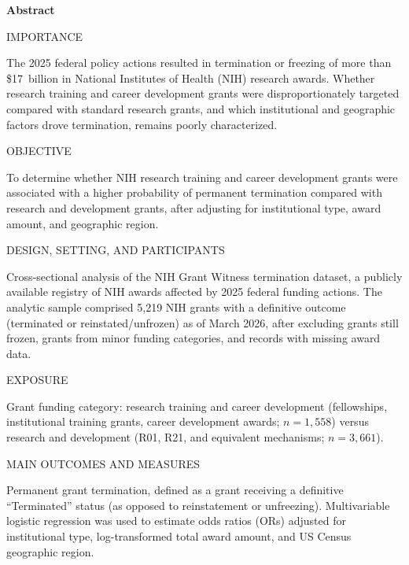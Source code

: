 \documentclass[10pt, letterpaper]{article}
\newcommand{\abslabel}[1]{%
  {\vspace{4pt}\noindent\sffamily\fontseries{b}\selectfont\fontsize{8.5}{10}\selectfont #1\enspace}%
}
\newcommand{\absrule}{%
  \vspace{3pt}\noindent{\color{jamacrimson}\rule{0.62\textwidth}{0.4pt}}\vspace{3pt}%
}
\begin{document}
\noindent
\begin{minipage}[t]{0.62\textwidth}
{\sffamily\bfseries\fontsize{11}{13}\selectfont\color{jamacrimson} Abstract\par}
\vspace{4pt}

\abslabel{IMPORTANCE}
{\fontsize{9}{11.5}\selectfont
The 2025 federal policy actions resulted in termination or freezing of more than \$17~billion in National Institutes of Health (NIH) research awards. Whether research training and career development grants were disproportionately targeted compared with standard research grants, and which institutional and geographic factors drove termination, remains poorly characterized.\par}

\absrule

\abslabel{OBJECTIVE}
{\fontsize{9}{11.5}\selectfont
To determine whether NIH research training and career development grants were associated with a higher probability of permanent termination compared with research and development grants, after adjusting for institutional type, award amount, and geographic region.\par}

\absrule

\abslabel{DESIGN, SETTING, AND PARTICIPANTS}
{\fontsize{9}{11.5}\selectfont
Cross-sectional analysis of the NIH Grant Witness termination dataset, a publicly available registry of NIH awards affected by 2025 federal funding actions. The analytic sample comprised 5,219 NIH grants with a definitive outcome (terminated or reinstated/unfrozen) as of March 2026, after excluding grants still frozen, grants from minor funding categories, and records with missing award data.\par}

\absrule

\abslabel{EXPOSURE}
{\fontsize{9}{11.5}\selectfont
Grant funding category: research training and career development (fellowships, institutional training grants, career development awards; $n = 1{,}558$) versus research and development (R01, R21, and equivalent mechanisms; $n = 3{,}661$).\par}

\absrule

\abslabel{MAIN OUTCOMES AND MEASURES}
{\fontsize{9}{11.5}\selectfont
Permanent grant termination, defined as a grant receiving a definitive ``Terminated'' status (as opposed to reinstatement or unfreezing). Multivariable logistic regression was used to estimate odds ratios (ORs) adjusted for institutional type, log-transformed total award amount, and US Census geographic region.\par}


\end{minipage}
\end{document}
